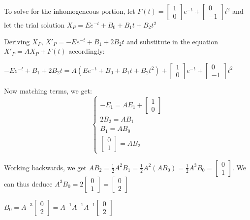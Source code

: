 \documentclass{article}
\begin{document}
\noindent To solve for the inhomogeneous portion, let $F(t) = \begin{bmatrix}
    1\\
    0
\end{bmatrix}e^{-t} + \begin{bmatrix}
    0\\
    -1
\end{bmatrix}t^{2}$ and let the trial solution $X_{P} = Ee^{-t} + B_{0} + B_{1}t + B_{2}t^{2}$ \par
\noindent Deriving $X_{P}$, $X'_{P} = -Ee^{-t} + B_{1} + 2B_{2}t$ and substitute in the equation $X'_{P} = AX_{P} + F(t)$ accordingly: \par
\noindent $-Ee^{-t} + B_{1} + 2B_{2}t = A(Ee^{-t} + B_{0} + B_{1}t + B_{2}t^{2}) + \begin{bmatrix}
    1\\
    0
\end{bmatrix}e^{-t} + \begin{bmatrix}
    0\\
    -1
\end{bmatrix}t^{2}$ \par

\noindent Now matching terms, we get: $$
\begin{cases}
-E_{1} = AE_{1} + \begin{bmatrix}
    1\\
    0
\end{bmatrix} \\
2B_{2} = AB_{1} \\
B_{1} = AB_{0} \\
\begin{bmatrix}
    0\\
    1
\end{bmatrix} = AB_{2} 
\end{cases}
$$ 

\noindent Working backwards, we get $AB_{2} = \frac{1}{2}A^{2}B_{1} = \frac{1}{2}A^{2}(AB_{0}) = \frac{1}{2}A^{3}B_{0} = \begin{bmatrix}
    0\\
    1
\end{bmatrix}$.  We can thus deduce $A^{3}B_{0} = 2\begin{bmatrix}
    0\\
    1
\end{bmatrix} = \begin{bmatrix}
    0\\
    2
\end{bmatrix}$ \par
\noindent $B_{0} = A^{-3}\begin{bmatrix}
    0\\
    2
\end{bmatrix} = A^{-1}A^{-1}A^{-1}\begin{bmatrix}
    0\\
    2
\end{bmatrix}$ \par
\end{document}
